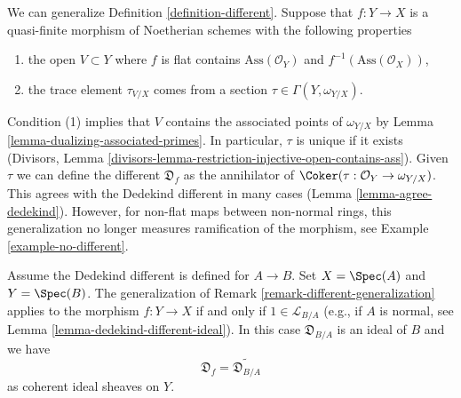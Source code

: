 \begin{remark}
\label{remark-different-generalization}
We can generalize Definition \ref{definition-different}.
Suppose that $f : Y \to X$ is a quasi-finite morphism of Noetherian schemes
with the following properties
\begin{enumerate}
\item the open $V \subset Y$ where $f$ is flat contains
$\text{Ass}(\mathcal{O}_Y)$ and $f^{-1}(\text{Ass}(\mathcal{O}_X))$,
\item the trace element $\tau_{V/X}$ comes from a section
$\tau \in \Gamma(Y, \omega_{Y/X})$.
\end{enumerate}
Condition (1) implies that $V$ contains the associated points of
$\omega_{Y/X}$ by Lemma \ref{lemma-dualizing-associated-primes}.
In particular, $\tau$ is unique if it exists
(Divisors, Lemma \ref{divisors-lemma-restriction-injective-open-contains-ass}).
Given $\tau$ we can define the different $\mathfrak{D}_f$ as the annihilator of
$\Coker(\tau : \mathcal{O}_Y \to \omega_{Y/X})$. This agrees with the
Dedekind different in many cases (Lemma \ref{lemma-agree-dedekind}).
However, for non-flat maps between non-normal rings, this generalization
no longer measures ramification of the morphism, see
Example \ref{example-no-different}.
\end{remark}

\begin{lemma}
\label{lemma-agree-dedekind}
Assume the Dedekind different is defined for $A \to B$.
Set $X = \Spec(A)$ and $Y = \Spec(B)$. The generalization of
Remark \ref{remark-different-generalization}
applies to the morphism $f : Y \to X$ if and only if
$1 \in \mathcal{L}_{B/A}$ (e.g., if $A$ is normal, see
Lemma \ref{lemma-dedekind-different-ideal}).
In this case $\mathfrak{D}_{B/A}$ is an ideal of $B$ and we have
$$
\mathfrak{D}_f = \widetilde{\mathfrak{D}_{B/A}}
$$
as coherent ideal sheaves on $Y$.
\end{lemma}

